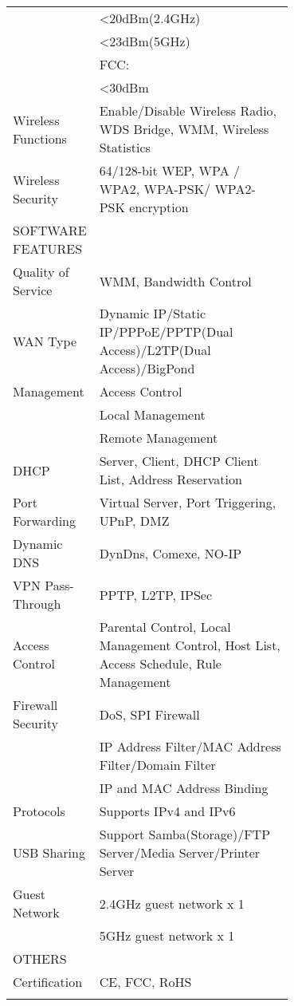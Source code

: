 \begin{longtable}{lp{0.7\linewidth}}
																		& \textless20dBm(2.4GHz)\\
																		& \textless23dBm(5GHz) \\
																		& FCC:\\
																		& \textless30dBm \\
		Wireless Functions 		 		 		 		 		 & Enable/Disable Wireless Radio, WDS Bridge, WMM, Wireless Statistics \\
		Wireless Security 		 		 		 		 		 & 64/128-bit WEP, WPA / WPA2, WPA-PSK/ WPA2-PSK encryption \\ \hline
		SOFTWARE FEATURES 		 		 		 		 		 & \\
		Quality of Service 		 		 		 		 		 & WMM, Bandwidth Control \\
		WAN Type 		 		 		 		 		 & Dynamic IP/Static IP/PPPoE/PPTP(Dual Access)/L2TP(Dual Access)/BigPond \\
		Management 		 		 		 		 		 & Access Control\\
																	& Local Management\\
																	& Remote Management \\
		DHCP 		 		 		 		 		 & Server, Client, DHCP Client List, Address Reservation \\
		Port Forwarding 		 		 		 		 		 & Virtual Server, Port Triggering, UPnP, DMZ \\
		Dynamic DNS 		 		 		 		 		 & DynDns, Comexe, NO-IP \\
		VPN Pass-Through 		 		 		 		 		 & PPTP, L2TP, IPSec \\
		Access Control 		 		 		 		 		 & Parental Control, Local Management Control, Host List, Access Schedule, Rule Management \\
		Firewall Security 		 		 		 		 		 & DoS, SPI Firewall\\
																		& IP Address Filter/MAC Address Filter/Domain Filter\\
																		& IP and MAC Address Binding \\
		Protocols 		 		 		 		 		 & Supports IPv4 and IPv6 \\
		USB Sharing 		 		 		 		 		 & Support Samba(Storage)/FTP Server/Media Server/Printer Server \\
		Guest Network 		 		 		 		 		 & 2.4GHz guest network x 1 \\
																		& 5GHz guest network x 1 \\ \hline
		OTHERS 		 		 		 		 		 & \\
		Certification 		 		 		 		 		 & CE, FCC, RoHS \\ \hline
		\label{tab:tplink-ac1750}
\end{longtable}



